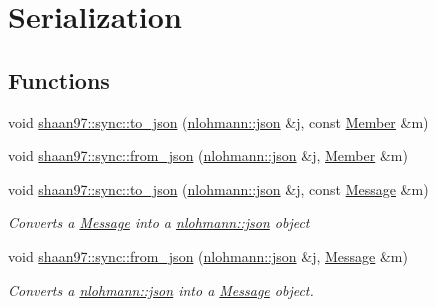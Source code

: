 \hypertarget{group___serialization}{}\section{Serialization}
\label{group___serialization}
\subsection*{Functions}
\begin{DoxyCompactItemize}
\item 
void \hyperlink{group___serialization_gaad90c8bd50725f5382dc2207225f52ee}{shaan97\+::sync\+::to\+\_\+json} (\hyperlink{namespacenlohmann_a2bfd99e845a2e5cd90aeaf1b1431f474}{nlohmann\+::json} \&j, const \hyperlink{classshaan97_1_1sync_1_1_member}{Member} \&m)
\item 
void \hyperlink{group___serialization_ga35dd3deb42a1ec52e00a2980b5c7c842}{shaan97\+::sync\+::from\+\_\+json} (\hyperlink{namespacenlohmann_a2bfd99e845a2e5cd90aeaf1b1431f474}{nlohmann\+::json} \&j, \hyperlink{classshaan97_1_1sync_1_1_member}{Member} \&m)
\item 
void \hyperlink{group___serialization_ga213581ca789d5151c699fb4cb30db916}{shaan97\+::sync\+::to\+\_\+json} (\hyperlink{namespacenlohmann_a2bfd99e845a2e5cd90aeaf1b1431f474}{nlohmann\+::json} \&j, const \hyperlink{structshaan97_1_1sync_1_1_message}{Message} \&m)
\begin{DoxyCompactList}\small\item\em Converts a {\ttfamily \hyperlink{structshaan97_1_1sync_1_1_message}{Message}} into a {\ttfamily \hyperlink{namespacenlohmann_a2bfd99e845a2e5cd90aeaf1b1431f474}{nlohmann\+::json} object} \end{DoxyCompactList}\item 
void \hyperlink{group___serialization_gaba06015bb8b13049b093f0bde8e89377}{shaan97\+::sync\+::from\+\_\+json} (\hyperlink{namespacenlohmann_a2bfd99e845a2e5cd90aeaf1b1431f474}{nlohmann\+::json} \&j, \hyperlink{structshaan97_1_1sync_1_1_message}{Message} \&m)
\begin{DoxyCompactList}\small\item\em Converts a {\ttfamily \hyperlink{namespacenlohmann_a2bfd99e845a2e5cd90aeaf1b1431f474}{nlohmann\+::json}} into a {\ttfamily \hyperlink{structshaan97_1_1sync_1_1_message}{Message}} object. \end{DoxyCompactList}\end{DoxyCompactItemize}
